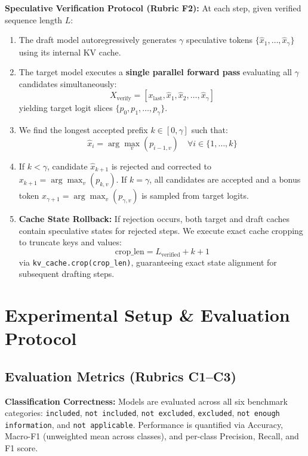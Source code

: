 \documentclass[conference]{IEEEtran}
\begin{document}
\textbf{Speculative Verification Protocol (Rubric F2):}
At each step, given verified sequence length $L$:
\begin{enumerate}
    \item The draft model autoregressively generates $\gamma$ speculative tokens $\{\hat{x}_1, \dots, \hat{x}_\gamma\}$ using its internal KV cache.
    \item The target model executes a \textbf{single parallel forward pass} evaluating all $\gamma$ candidates simultaneously:
    \begin{equation}
        X_{\text{verify}} = [x_{\text{last}}, \hat{x}_1, \hat{x}_2, \dots, \hat{x}_\gamma]
    \end{equation}
    yielding target logit slices $\{p_0, p_1, \dots, p_\gamma\}$.
    \item We find the longest accepted prefix $k \in [0, \gamma]$ such that:
    \begin{equation}
        \hat{x}_i = \arg\max_{v} \left( p_{i-1, v} \right) \quad \forall i \in \{1, \dots, k\}
    \end{equation}
    \item If $k < \gamma$, candidate $\hat{x}_{k+1}$ is rejected and corrected to $x_{k+1} = \arg\max_v (p_{k, v})$. If $k = \gamma$, all candidates are accepted and a bonus token $x_{\gamma+1} = \arg\max_v (p_{\gamma, v})$ is sampled from target logits.
    \item \textbf{Cache State Rollback:} If rejection occurs, both target and draft caches contain speculative states for rejected steps. We execute exact cache cropping to truncate keys and values:
    \begin{equation}
        \text{crop\_len} = L_{\text{verified}} + k + 1
    \end{equation}
    via \texttt{kv\_cache.crop(crop\_len)}, guaranteeing exact state alignment for subsequent drafting steps.
\end{enumerate}

\section{Experimental Setup \& Evaluation Protocol}
\label{sec:experiments}

\subsection{Evaluation Metrics (Rubrics C1--C3)}
\textbf{Classification Correctness:} Models are evaluated across all six benchmark categories: \texttt{included}, \texttt{not included}, \texttt{not excluded}, \texttt{excluded}, \texttt{not enough information}, and \texttt{not applicable}. Performance is quantified via Accuracy, Macro-F1 (unweighted mean across classes), and per-class Precision, Recall, and F1 score.
\end{document}
